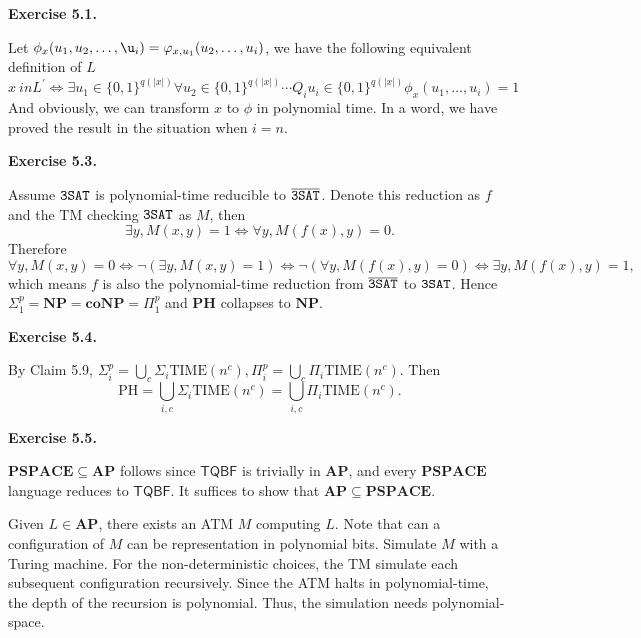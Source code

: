 \documentclass[a4paper]{article}
\newenvironment{exercise}[1]{
	\par
	\noindent\textbf{Exercise #1.}\quad
}{
	\par
	\bigskip
}
\newcommand{\pbra}[1]{\left( #1 \right)}
\begin{document}
\begin{exercise}{5.1}
\begin{itemize}
        Let $\phi_{x}(u_1,u_2,\dots,\u_i)=\varphi_{x,u_1}(u_2,\dots,u_i)$, we have the following equivalent definition of $L$
        \begin{equation}
        x\ in L^{\prime} \iff  \exists u_1\in\{0,1\}^{q(|x|)} \forall u_2 \in \{0,1\}^{q(|x|)}\cdots Q_iu_i\in\{0,1\}^{q(|x|)} \phi_{x}(u_1,\dots,u_i)=1
        \end{equation}
        And obviously, we can transform $x$ to $\phi$ in polynomial time. In a word, we have proved the result in the situation when $i=n$. 
    \end{itemize} 
    
\end{exercise}

\begin{exercise}{5.3}
    Assume $\tt 3SAT$ is polynomial-time reducible to $\overline{\tt 3SAT}$. Denote this reduction as $f$ and the TM checking
    $\tt 3SAT$ as $M$, then
    $$
    \exists y,M(x,y)=1\iff \forall y,M(f(x),y)=0.
    $$
    Therefore
    $$
    \forall y,M(x,y)=0\iff\neg\pbra{\exists y,M(x,y)=1}\iff\neg\pbra{\forall y,M(f(x),y)=0}\iff\exists y,M(f(x),y)=1,
    $$
    which means $f$ is also the polynomial-time reduction from $\overline{\tt 3SAT}$ to $\tt 3SAT$.
    Hence $\Sigma_1^p=\mathbf{NP}=\mathbf{coNP}=\Pi_1^p$ and $\mathbf{PH}$ collapses to $\mathbf{NP}$.
\end{exercise}

\begin{exercise}{5.4}
    By Claim 5.9, $\Sigma_i^p=\bigcup_c\Sigma_i\text{TIME}(n^c),\Pi_i^p=\bigcup_c\Pi_i\text{TIME}(n^c)$.
    Then 
    $$
    \text{PH}=\bigcup_{i,c}\Sigma_i\text{TIME}(n^c)=\bigcup_{i,c}\Pi_i\text{TIME}(n^c).
    $$
\end{exercise}

\begin{exercise}{5.5}
    $\mathbf{PSPACE} \subseteq \mathbf{AP}$ follows since $\mathsf{TQBF}$ is trivially in $\mathbf{AP}$, and every $\mathbf{PSPACE}$ language reduces to $\mathsf{TQBF}$. It suffices to show that $\mathbf{AP} \subseteq \mathbf{PSPACE}$.

    Given $L \in \mathbf{AP}$, there exists an ATM $M$ computing $L$. Note that can a configuration of $M$ can be representation in polynomial bits. Simulate $M$ with a Turing machine. For the non-deterministic choices, the TM simulate each subsequent configuration recursively. Since the ATM halts in polynomial-time, the depth of the recursion is polynomial. Thus, the simulation needs polynomial-space.
\end{exercise}
\end{document}
